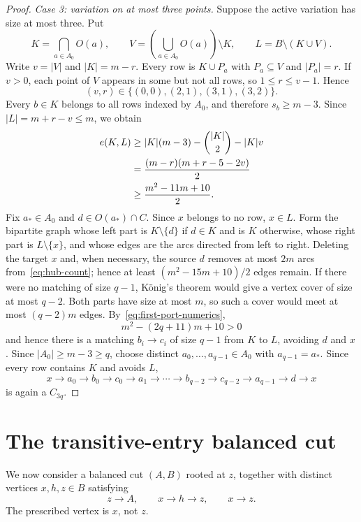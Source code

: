 \documentclass[11pt]{amsart}
\theoremstyle{definition}
\begin{document}
\begin{proof}
\smallskip
\noindent\emph{Case 3: variation on at most three points.}
Suppose the active variation has size at most three.  Put
\[
  K=\bigcap_{a\in A_0}O(a),\qquad
  V=\left(\bigcup_{a\in A_0}O(a)\right)\setminus K,
  \qquad L=B\setminus(K\cup V).
\]
Write $v=|V|$ and $|K|=m-r$.  Every row is $K\cup P_a$ with $P_a\subseteq V$ and $|P_a|=r$.  If $v>0$, each point of $V$ appears in some but not all rows, so $1\le r\le v-1$.  Hence
\[
  (v,r)\in\{(0,0),(2,1),(3,1),(3,2)\}.
\]
Every $b\in K$ belongs to all rows indexed by $A_0$, and therefore $s_b\ge m-3$.  Since $|L|=m+r-v\le m$, we obtain
\begin{align}
e(K,L)
&\ge |K|(m-3)-\binom{|K|}{2}-|K|v\notag\\
&=\frac{(m-r)(m+r-5-2v)}2\notag\\
&\ge\frac{m^2-11m+10}{2}.
\label{eq:hub-count}
\end{align}
Fix $a_*\in A_0$ and $d\in O(a_*)\cap C$.  Since $x$ belongs to no
row, $x\in L$.  Form the bipartite graph whose left part is
$K\setminus\{d\}$ if $d\in K$ and is $K$ otherwise, whose right part
is $L\setminus\{x\}$, and whose edges are the arcs directed from left
to right.  Deleting the target $x$ and, when necessary, the source $d$
removes at most $2m$ arcs from~\eqref{eq:hub-count}; hence at least
$(m^2-15m+10)/2$ edges remain.  If there were no matching of size
$q-1$, K\"onig's theorem would give a vertex cover of size at most
$q-2$.  Both parts have size at most $m$, so such a cover would meet at
most $(q-2)m$ edges.  By~\eqref{eq:first-port-numerics},
\[
  m^2-(2q+11)m+10>0
\]
and hence there is a matching $b_i\to c_i$ of size $q-1$ from $K$ to
$L$, avoiding $d$ and $x$.  Since $|A_0|\ge m-3\ge q$, choose
distinct $a_0,\ldots,a_{q-1}\in A_0$ with $a_{q-1}=a_*$.  Since every
row contains $K$ and avoids $L$,
\[
  x\to a_0\to b_0\to c_0\to a_1\to\cdots
  \to b_{q-2}\to c_{q-2}\to a_{q-1}\to d\to x
\]
is again a $C_{3q}$.
\end{proof}

\section{The transitive-entry balanced cut}\label{sec:second-port}

We now consider a balanced cut $(A,B)$ rooted at $z$, together with distinct vertices $x,h,z\in B$ satisfying
\begin{equation}\label{eq:external-port}
  z\to A,\qquad x\to h\to z,\qquad x\to z.
\end{equation}
The prescribed vertex is $x$, not $z$.
\end{document}
